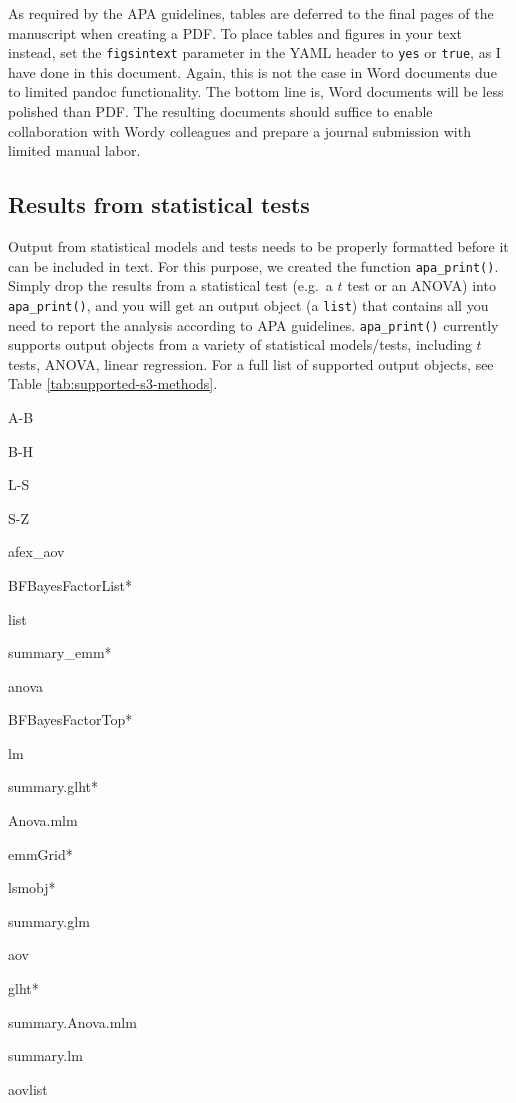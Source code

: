\documentclass[man,floatsintext]{apa6}
\theoremstyle{definition}
\theoremstyle{definition}
\theoremstyle{definition}
\theoremstyle{remark}
\begin{document}
As required by the APA guidelines, tables are deferred to the final
pages of the manuscript when creating a PDF. To place tables and figures
in your text instead, set the \texttt{figsintext} parameter in the YAML
header to \texttt{yes} or \texttt{true}, as I have done in this
document. Again, this is not the case in Word documents due to limited
pandoc functionality. The bottom line is, Word documents will be less
polished than PDF. The resulting documents should suffice to enable
collaboration with Wordy colleagues and prepare a journal submission
with limited manual labor.

\subsection{Results from statistical
tests}\label{results-from-statistical-tests}

Output from statistical models and tests needs to be properly formatted
before it can be included in text. For this purpose, we created the
function \texttt{apa\_print()}. Simply drop the results from a
statistical test (e.g.~a \(t\) test or an ANOVA) into
\texttt{apa\_print()}, and you will get an output object (a
\texttt{list}) that contains all you need to report the analysis
according to APA guidelines. \texttt{apa\_print()} currently supports
output objects from a variety of statistical models/tests, including
\(t\) tests, ANOVA, linear regression. For a full list of supported
output objects, see Table \ref{tab:supported-s3-methods}.

A-B

B-H

L-S

S-Z

afex\_aov

BFBayesFactorList*

list

summary\_emm*

anova

BFBayesFactorTop*

lm

summary.glht*

Anova.mlm

emmGrid*

lsmobj*

summary.glm

aov

glht*

summary.Anova.mlm

summary.lm

aovlist
\end{document}
